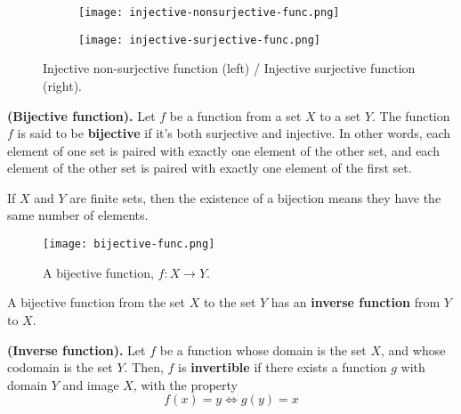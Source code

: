 \begin{figure}[htbp]
    \centering
    \begin{subfigure}{.25\textwidth}
        \texttt{[image: injective-nonsurjective-func.png]}
    \end{subfigure}
    \hspace{1cm}
    \begin{subfigure}{.25\textwidth}
        \texttt{[image: injective-surjective-func.png]}
    \end{subfigure}
    \caption{Injective non-surjective function (left) / Injective surjective function (right).}
\end{figure}

\begin{definition}
    \textbf{(Bijective function).} Let $f$ be a function from a set $X$ to a set $Y$. The function $f$ is said to be \textbf{bijective} if it's both surjective and injective. In other words, each element of one set is paired with exactly one element of the other set, and each element of the other set is paired with exactly one element of the first set.
\end{definition}

\begin{remark}
    If $X$ and $Y$ are finite sets, then the existence of a bijection means they have the same number of elements.
\end{remark}
\begin{figure}[htbp]
    \centerline{\texttt{[image: bijective-func.png]}}
    \caption{A bijective function, $f:X\to Y$.}
\end{figure}

A bijective function from the set $X$ to the set $Y$ has an \textbf{inverse function} from $Y$ to $X$.

\begin{definition}
    \textbf{(Inverse function).} Let $f$ be a function whose domain is the set $X$, and whose codomain is the set $Y$. Then, $f$ is \textbf{invertible} if there exists a function $g$ with domain $Y$ and image $X$, with the property
    \begin{equation}
        f\left( x \right) = y \iff g\left( y \right) = x
    \end{equation}
\end{definition}

